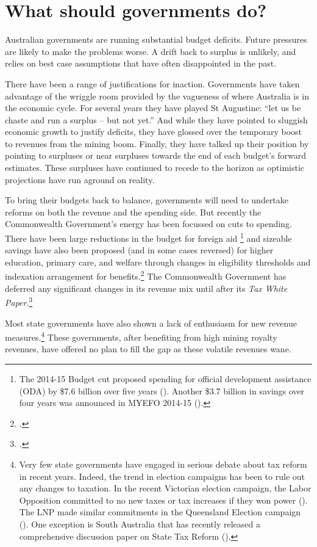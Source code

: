 \chapter{What should governments do?}
Australian governments are running substantial budget deficits. Future pressures are likely to make the problems worse. A drift back to surplus is unlikely, and relies on best case assumptions that have often disappointed in the past. 

There have been a range of justifications for inaction. Governments have taken advantage of the wriggle room provided by the vagueness of where Australia is in the economic cycle. For several years they have played St Augustine: “let us be chaste and run a surplus – but not yet.” And while they have pointed to sluggish economic growth to justify deficits, they have glossed over the temporary boost to revenues from the mining boom. Finally, they have talked up their position by pointing to surpluses or near surpluses towards the end of each budget’s forward estimates. These surpluses have continued to recede to the horizon as optimistic projections have run aground on reality.

To bring their budgets back to balance, governments will need to undertake reforms on both the revenue and the spending side. But recently the Commonwealth Government’s energy has been focussed on cuts to spending. There have been large reductions in the budget for foreign aid%
\footnote{The 2014-15 Budget cut proposed spending for official development assistance (ODA) by \$7.6 billion over five years (\textcite[][121]{Treasury2014-Budget-Papers-2014-15}). Another \$3.7 billion in savings over four years was announced in MYEFO 2014-15 (\textcite[][47]{Treasury2014-MYEFO-2014-15}).} %
and sizeable savings have also been proposed (and in some cases reversed) for higher education, primary care, and welfare through changes in eligibility thresholds and indexation arrangement for benefits.\footcites[][BP~No.~2, pp.~7,~133, 197-204, 210]{Treasury2014-Budget-Papers-2014-15}  The Commonwealth Government has deferred any significant changes in its revenue mix until after its \emph{Tax White Paper}.\footcite{Loughnane2013} 

Most state governments have also shown a lack of enthusiasm for new revenue measures.\footnote{Very few state governments have engaged in serious debate about tax reform in recent years. Indeed, the trend in election campaigns has been to rule out any changes to taxation. In the recent Victorian election campaign, the Labor Opposition committed to no new taxes or tax increases if they won power (\textcite{Savage2014}). The LNP made similar commitments in the Queensland Election campaign (\textcite{Eaton2015}). One exception is South Australia that has recently released a comprehensive discussion paper on State Tax Reform (\textcite{GovernmentSouthAustralia2015-State-Tax-Review-Discussion-Paper}).}  These governments, after benefiting from high mining royalty revenues, have offered no plan to fill the gap as these volatile revenues wane. 

